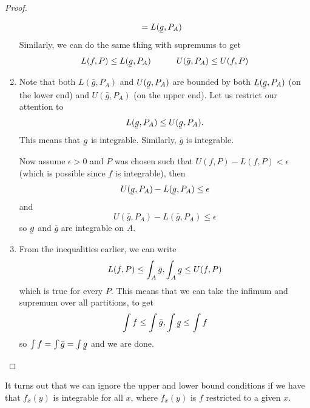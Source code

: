 \documentclass{article}
\newcommand{\ubar}[1]{\underaccent{\bar}{#1}}
\numberwithin{equation}{section}
\begin{document}
\begin{proof}
\begin{enumerate}
\begin{align}
                         & = L(\ubar{g},P_A)
              \end{align}
              Similarly, we can do the same thing with supremums to get
              \begin{equation}
                  L(f,P) \le L(\ubar{g}, P_A) \quad\quad\quad U(\bar{g}, P_A) \le U(f,P)
              \end{equation}
              \item Note that both $L(\bar{g},P_A)$ and $U(\ubar{g},P_A)$ are bounded by both $L(\ubar{g},P_A)$ (on the lower end) and $U(\bar{g},P_A)$ (on the upper end). Let us restrict our attention to
              \begin{equation}
                  L(\ubar{g}, P_A) \le U(\ubar{g}, P_A).
              \end{equation}
              This means that $\ubar{g}$ is integrable. Similarly, $\bar{g}$ is integrable.

              Now assume $\epsilon > 0$ and $P$ was chosen such that $U(f,P)-L(f,P) < \epsilon$ (which is possible since $f$ is integrable), then
              \begin{equation}
                  U(\ubar{g}, P_A) - L(\ubar{g}, P_A) \le \epsilon
              \end{equation}
              and 
              \begin{equation}
                    U(\bar{g}, P_A) - L(\bar{g}, P_A) \le \epsilon
              \end{equation}
              so $\ubar{g}$ and $\bar{g}$ are integrable on $A$.
              \item From the inequalities earlier, we can write  
              \begin{equation}
                  L(f,P) \le \int_A \bar{g}, \int_A \ubar{g} \le U(f,P)
              \end{equation}
              which is true for every $P$. This means that we can take the infimum and supremum over all partitions, to get
              \begin{equation}
                  \int f \le \int \bar{g}, \int \ubar{g} \le \int f
              \end{equation}
              so $\int f = \int \bar{g} = \int \ubar{g}$ and we are done.
    \end{enumerate}
\end{proof}
It turns out that we can ignore the upper and lower bound conditions if we have that $f_x(y)$ is integrable for all $x$, where $f_x(y)$ is $f$ restricted to a given $x$.
\end{document}
